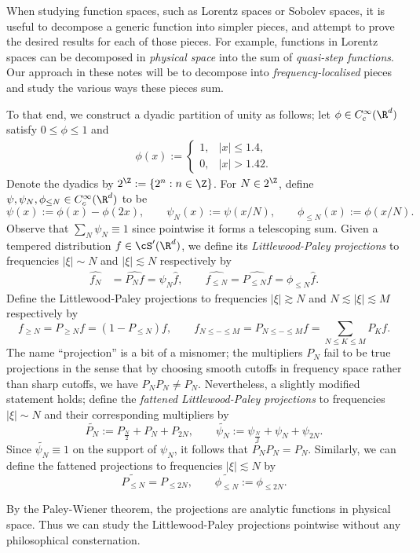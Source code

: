 When studying function spaces, such as Lorentz spaces or Sobolev spaces, it is useful to decompose a generic function into simpler pieces, and attempt to prove the desired results for each of those pieces. For example, functions in Lorentz spaces can be decomposed in \textit{physical space} into the sum of \textit{quasi-step functions}. Our approach in these notes will be to decompose into \textit{frequency-localised} pieces and  study the various ways these pieces sum. 

To that end, we construct a dyadic partition of unity as follows; let $\phi  \in C^\infty_c (\R^d)$ satisfy $0 \leq \phi \leq 1$ and 
\begin{align*}
	\phi(x) 
		:= 
		\begin{cases}
			1 , 				&|x| \leq 1.4, \\
			0, 				&|x| > 1.42. 
		\end{cases}
\end{align*}
Denote the dyadics by $2^\Z := \{ 2^n : n \in \Z \}$. For $N \in 2^\Z$, define $\psi, \psi_N, \phi_{\leq N} \in C^\infty_c (\R^d)$ to be 
	\[ \psi(x) := \phi(x) - \phi(2x), \qquad \psi_N (x) := \psi(x/N), \qquad \phi_{\leq N} (x) := \phi(x/N).  \]
Observe that $\sum_N \psi_N \equiv 1$ since pointwise it forms a telescoping sum. Given a tempered distribution $f \in \cS' (\R^d)$, we define its \emph{Littlewood-Paley projections} to frequencies $|\xi| \sim N$ and $|\xi| \lesssim N$ respectively by
	\begin{align*}
		\widehat{f_N} &= \widehat{P_N f}  = \psi_N \widehat f , \qquad
		\widehat{f_{\leq N}} = \widehat{P_{\leq N} f} = \phi_{\leq N} \widehat f.
	\end{align*}	
Define the Littlewood-Paley projections to frequencies $|\xi| \gtrsim N$ and $N \lesssim |\xi| \lesssim M$ respectively by 
	\[ f_{\geq N} = P_{\geq N} f = (1 - P_{\leq N}) f, \qquad f_{N \leq - \leq M} = P_{N \leq - \leq M} f = \sum_{N \leq K \leq M} P_K f. \]
The name ``projection'' is a bit of a misnomer; the multipliers $P_N$ fail to be true projections in the sense that by choosing smooth cutoffs in frequency space rather than sharp cutoffs, we have $P_N P_N \neq P_N$. Nevertheless, a slightly modified statement holds; define the \emph{fattened Littlewood-Paley projections} to frequencies $|\xi| \sim N$ and their corresponding multipliers by
	\[ \widetilde{P_N} := P_{\frac{N}{2}} + P_{N} + P_{2N},\qquad  \widetilde{\psi_N} := \psi_{\frac{N}{2}} + \psi_N + \psi_{2N}. \]
Since $\widetilde{\psi_N} \equiv 1$ on the support of $\psi_N$, it follows that $\widetilde{P_N} P_N = P_N$. Similarly, we can define the fattened projections to frequencies $|\xi| \lesssim N$ by 
	\[ \widetilde{P_{\leq N}} = P_{\leq 2N}, \qquad \widetilde{\phi_{\leq N}} := \phi_{\leq 2N}.  \]	

\begin{remark}
	By the Paley-Wiener theorem, the projections are analytic functions in physical space. Thus we can study the Littlewood-Paley projections pointwise without any philosophical consternation.
\end{remark}


